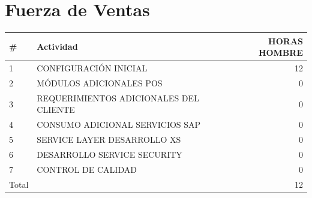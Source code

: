 \documentclass[pdftex,12pt,oneside,a4paper,spanish, english, brazil]{abntex2}
\begin{document}
\begin{sloppypar}
             \section{Fuerza de Ventas}
             \begin{table}[htbp]
             	\small
             	\centering
             	
             	\begin{tabular}{llr}       		
             		\# & Actividad & HORAS HOMBRE\\
             		\midrule
             		1 &	CONFIGURACIÓN INICIAL	& 12 \\
             		2 &	MÓDULOS ADICIONALES POS	& 0 \\
             		3 &	REQUERIMIENTOS ADICIONALES DEL CLIENTE	& 0 \\
             		4 &	CONSUMO ADICIONAL SERVICIOS SAP	& 0 \\
             		5 &	SERVICE LAYER DESARROLLO XS	& 0 \\
             		6 &	DESARROLLO SERVICE SECURITY	& 0 \\
             		7 &	CONTROL DE CALIDAD	& 0 \\
             		\bottomrule
             		Total & & 12 \\
             	\end{tabular}%
             \end{table}%
    \end{sloppypar}
\end{document}
